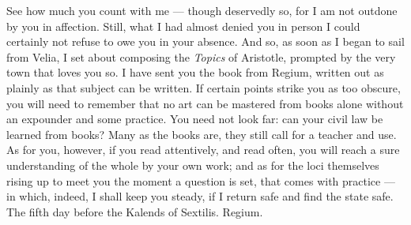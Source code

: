 

 See how much you count with me --- though deservedly so, for I am not outdone by you in affection. Still, what I had almost denied you in person I could certainly not refuse to owe you in your absence. And so, as soon as I began to sail from Velia, I set about composing the \textit{Topics} of Aristotle, prompted by the very town that loves you so. I have sent you the book from Regium, written out as plainly as that subject can be written. If certain points strike you as too obscure, you will need to remember that no art can be mastered from books alone without an expounder and some practice. You need not look far: can your civil law be learned from books? Many as the books are, they still call for a teacher and use. As for you, however, if you read attentively, and read often, you will reach a sure understanding of the whole by your own work; and as for the loci themselves rising up to meet you the moment a question is set, that comes with practice --- in which, indeed, I shall keep you steady, if I return safe and find the state safe. The fifth day before the Kalends of Sextilis. Regium.
